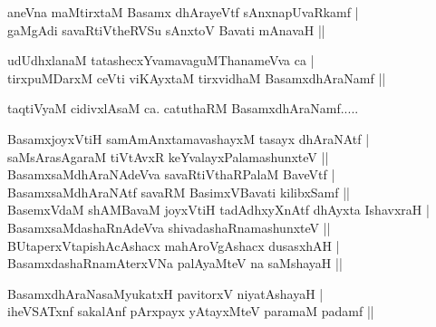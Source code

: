 \begin{entry}
\begin{shl}
aneVna maMtirxtaM Basamx dhArayeVtf sAnxnapUvaRkamf |\\
gaMgAdi savaRtiVtheRVSu sAnxtoV Bavati mAnavaH ||
\end{shl}
\begin{shl}
udUdhxlanaM tatashecxYvamavaguMThanameVva ca |\\
tirxpuMDarxM ceVti viKAyxtaM tirxvidhaM BasamxdhAraNamf ||
\end{shl}

\gl{}
\begin{shl}
taqtiVyaM cidivxlAsaM ca. catuthaRM BasamxdhAraNamf.....
\end{shl}
\end{entry}

\begin{entry}
\begin{shl}
BasamxjoyxVtiH samAmAnxtamavashayxM tasayx dhAraNAtf |\\
saMsArasAgaraM tiVtAvxR keYvalayxPalamashunxteV ||\\
BasamxsaMdhAraNAdeVva savaRtiVthaRPalaM BaveVtf |\\
BasamxsaMdhAraNAtf savaRM BasimxVBavati kilibxSamf ||\\
BasemxVdaM shAMBavaM joyxVtiH tadAdhxyXnAtf dhAyxta IshavxraH |\\
BasamxsaMdashaRnAdeVva shivadashaRnamashunxteV ||\\
BUtaperxVtapishAcAshacx mahAroVgAshacx dusasxhAH |\\
BasamxdashaRnamAterxVNa palAyaMteV na saMshayaH ||
\end{shl}
\begin{shl}
BasamxdhAraNasaMyukatxH pavitorxV niyatAshayaH |\\
iheVSATxnf sakalAnf pArxpayx yAtayxMteV paramaM padamf ||
\end{shl}
\end{entry}

